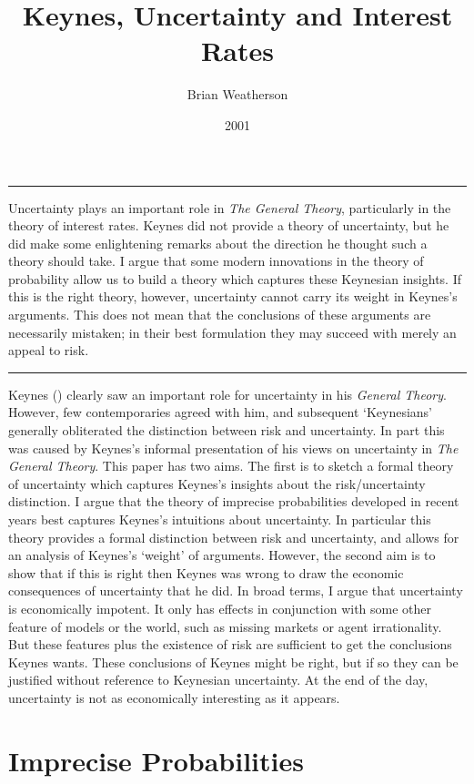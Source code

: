 \documentclass[
  10pt,
  letterpaper,
  DIV=11,
  numbers=noendperiod,
  twoside]{scrartcl}
\title{Keynes, Uncertainty and Interest Rates}
\author{Brian Weatherson}
\date{2001}
\renewenvironment{abstract}
 {\vspace{-1.25cm}
 \quotation\small\noindent\rule{\linewidth}{.5pt}\par\smallskip
 \noindent }
 {\par\noindent\rule{\linewidth}{.5pt}\endquotation}
\begin{document}
\maketitle
\begin{abstract}
Uncertainty plays an important role in \emph{The General Theory},
particularly in the theory of interest rates. Keynes did not provide a
theory of uncertainty, but he did make some enlightening remarks about
the direction he thought such a theory should take. I argue that some
modern innovations in the theory of probability allow us to build a
theory which captures these Keynesian insights. If this is the right
theory, however, uncertainty cannot carry its weight in Keynes's
arguments. This does not mean that the conclusions of these arguments
are necessarily mistaken; in their best formulation they may succeed
with merely an appeal to risk.
\end{abstract}

Keynes () clearly saw an important role
for uncertainty in his \emph{General Theory}. However, few
contemporaries agreed with him, and subsequent `Keynesians' generally
obliterated the distinction between risk and uncertainty. In part this
was caused by Keynes's informal presentation of his views on uncertainty
in \emph{The General Theory}. This paper has two aims. The first is to
sketch a formal theory of uncertainty which captures Keynes's insights
about the risk/uncertainty distinction. I argue that the theory of
imprecise probabilities developed in recent years best captures Keynes's
intuitions about uncertainty. In particular this theory provides a
formal distinction between risk and uncertainty, and allows for an
analysis of Keynes's `weight' of arguments. However, the second aim is
to show that if this is right then Keynes was wrong to draw the economic
consequences of uncertainty that he did. In broad terms, I argue that
uncertainty is economically impotent. It only has effects in conjunction
with some other feature of models or the world, such as missing markets
or agent irrationality. But these features plus the existence of risk
are sufficient to get the conclusions Keynes wants. These conclusions of
Keynes might be right, but if so they can be justified without reference
to Keynesian uncertainty. At the end of the day, uncertainty is not as
economically interesting as it appears.

\section{Imprecise Probabilities}\label{imprecise-probabilities}
\end{document}
